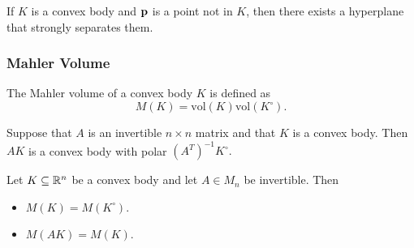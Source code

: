 \begin{theorem}
    If \(K\) is a convex body and \(\bf p\) is a point not in \(K\), then there exists a hyperplane that strongly separates them.
\end{theorem}

\subsubsection{Mahler Volume}
\begin{definition}
    The Mahler volume of a convex body \(K\) is defined as
    \[M(K) = \mathrm{vol}(K)\mathrm{vol}(K^\circ).\]
\end{definition}

\begin{lemma}
    Suppose that \(A\) is an invertible \(n \times n\) matrix and that \(K\) is a convex body. Then \(AK\) is a convex body with polar \((A^T)^{-1}K^\circ.\)
\end{lemma}

\begin{theorem}
    Let \(K \subseteq \mathbb{R}^n\) be a convex body and let \(A \in M_n\) be invertible. Then
    \begin{itemize}
        \item \(M(K) = M(K^\circ)\).
        \item \(M(AK) = M(K)\).
    \end{itemize}
\end{theorem}

\newpage